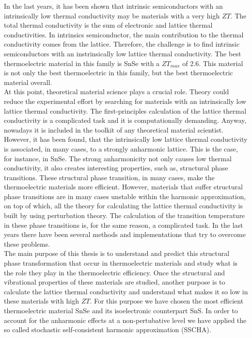 In the last years, it has been shown that intrinsic semiconductors with an intrinsically low thermal conductivity 
may be materials with a very high $ZT$. The total thermal conductivity is the sum of electronic and lattice thermal 
conductivities. In intrinsics semiconductor, the main contribution to the thermal conductivity comes from the 
lattice. Therefore, the challenge is to find intrinsic semiconductors with an instrinsically low lattice thermal 
conductivity. The best thermoelectric material in this family is SnSe with a $ZT_{max}$ of 2.6. This material is 
not only the best thermoelectric in this family, but the best thermoelectric material overall. \\

At this point, theoretical material science plays a crucial role. Theory could reduce the experimental effort by 
searching for materials with an intrinsically low lattice thermal conductivity. The first-principles calculation of 
the lattice thermal conductivity is a complicated task and it is computationally demanding. Anyway, nowadays it is 
included in the toolkit of any theoretical material scientist. However, it has been found, that the intrinsically 
low lattice thermal conductivity is associated, in many cases, to a strongly anharmonic lattice. This is the case, 
for instance, in SnSe. The strong anharmonicity not only causes low thermal conductivity, it also creates 
interesting properties, such as, structural phase transitions. These structural phase transition, in many cases, 
make the thermoelectric materials more efficient. However, materials that suffer structural phase transitions are 
in many cases unstable within the harmonic approximation, on top of which, all the theory for calculating the 
lattice thermal conductivity is built by using perturbation theory. The calculation of the transition temperature 
in these phase transitions is, for the same reason, a complicated task. In the last years there have been several 
methods and implementations that try to overcome these problems. \\

The main purpose of this thesis is to understand and predict this structural phase transformation that occur in 
thermoelectric materials and study what is the role they play in the thermoelectric efficiency. Once the structural 
and vibrational properties of these materials are studied, another purpose is to calculate the lattice thermal 
conductivity and understand what makes it so low in these materials with high $ZT$. For this purpose we have chosen 
the most efficient thermoelectric material SnSe and its isoelectronic counterpart SnS. In order to account for the 
anharmonic effects at a non-pertubative level we have applied the so called stochastic self-consistent harmonic 
approximation (SSCHA). \\

